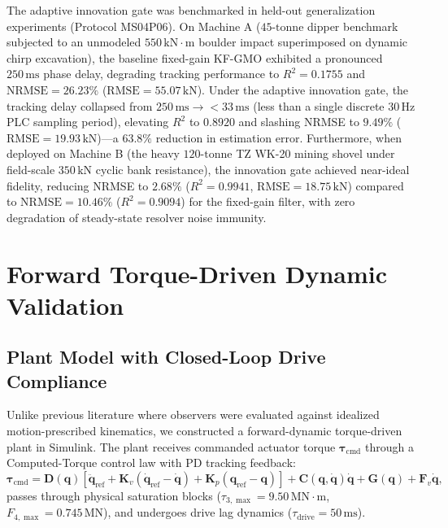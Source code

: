 \documentclass[journal]{IEEEtran}
\begin{document}
The adaptive innovation gate was benchmarked in held-out generalization experiments (Protocol MS04P06). On Machine A ($45\text{-tonne}$ dipper benchmark subjected to an unmodeled $550\,\mathrm{kN\cdot m}$ boulder impact superimposed on dynamic chirp excavation), the baseline fixed-gain KF-GMO exhibited a pronounced $250\,\mathrm{ms}$ phase delay, degrading tracking performance to $R^2 = 0.1755$ and $\mathrm{NRMSE} = 26.23\%$ ($\mathrm{RMSE} = 55.07\,\mathrm{kN}$). Under the adaptive innovation gate, the tracking delay collapsed from $250\,\mathrm{ms} \rightarrow <33\,\mathrm{ms}$ (less than a single discrete $30\,\mathrm{Hz}$ PLC sampling period), elevating $R^2$ to $0.8920$ and slashing NRMSE to $9.49\%$ ($\mathrm{RMSE} = 19.93\,\mathrm{kN}$)—a $63.8\%$ reduction in estimation error. Furthermore, when deployed on Machine B (the heavy $120\text{-tonne}$ TZ WK-20 mining shovel under field-scale $350\,\mathrm{kN}$ cyclic bank resistance), the innovation gate achieved near-ideal fidelity, reducing NRMSE to $2.68\%$ ($R^2 = 0.9941$, $\mathrm{RMSE} = 18.75\,\mathrm{kN}$) compared to $\mathrm{NRMSE} = 10.46\%$ ($R^2 = 0.9094$) for the fixed-gain filter, with zero degradation of steady-state resolver noise immunity.

\section{Forward Torque-Driven Dynamic Validation}

\subsection{Plant Model with Closed-Loop Drive Compliance}
Unlike previous literature where observers were evaluated against idealized motion-prescribed kinematics, we constructed a forward-dynamic torque-driven plant in Simulink. The plant receives commanded actuator torque $\bm{\tau}_{\mathrm{cmd}}$ through a Computed-Torque control law with PD tracking feedback:
\begin{equation}
\bm{\tau}_{\mathrm{cmd}} = \bm{D}(\bm{q})\left[\ddot{\bm{q}}_{\mathrm{ref}} + \bm{K}_v (\dot{\bm{q}}_{\mathrm{ref}} - \dot{\bm{q}}) + \bm{K}_p (\bm{q}_{\mathrm{ref}} - \bm{q})\right] + \bm{C}(\bm{q},\dot{\bm{q}})\dot{\bm{q}} + \bm{G}(\bm{q}) + \bm{F}_v \dot{\bm{q}},
\end{equation}
passes through physical saturation blocks ($\tau_{3,\max} = 9.50\,\mathrm{MN\cdot m}$, $F_{4,\max} = 0.745\,\mathrm{MN}$), and undergoes drive lag dynamics ($\tau_{\mathrm{drive}} = 50\,\mathrm{ms}$).
\end{document}
